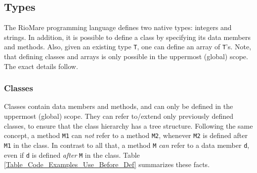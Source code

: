 \documentclass{article}
\begin{document}
\subsection{Types}
The RioMare programming language defines two native types: integers and strings.
In addition, it is possible to define a class by specifying its data members and methods.
Also, given an existing type \verb"T", one can define an array of \verb"T"'s.
Note, that defining classes and arrays is only possible in the uppermost (global) scope.
The exact details follow.
\subsubsection{Classes}
Classes contain data members and methods,
and can only be defined in the uppermost (global) scope.
They can refer to/extend only previously defined classes,
to ensure that the class hierarchy has a tree structure.
Following the same concept,
a method \verb"M1" can \textit{not} refer to a method \verb"M2",
whenever \verb"M2" is defined after \verb"M1" in the class.
In contrast to all that,
a method \verb"M" \textit{can} refer to a data member \verb"d",
even if \verb"d" is defined \textit{after} \verb"M" in the class.
Table \ref{Table_Code_Examples_Use_Before_Def} summarizes these facts.
\end{document}
